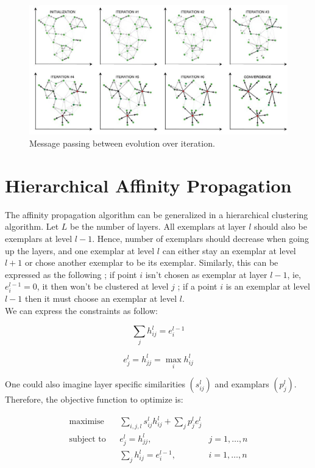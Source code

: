 \documentclass{ipol}
\begin{document}
\begin{figure}
\includegraphics[width=500px]{./images/AP_frey.png}
\caption{Message passing between evolution over iteration.}
\end{figure}

\section{Hierarchical Affinity Propagation}

The affinity propagation algorithm can be generalized in a hierarchical
clustering algorithm. Let $L$ be the number of layers. All exemplars at layer
$l$ should also be exemplars at level $l -1$. Hence, number of exemplars
should decrease when going up the layers, and one exemplar at level $l$ can
either stay an exemplar at level $l + 1$ or chose another exemplar to be its
exemplar. Similarly, this can be expressed as the following ; if point $i$ isn't chosen as
exemplar at layer $l - 1$, ie, $e_{i}^{l - 1} = 0$, it then won't be clustered at
level $j$ ; if a point $i$ is an exemplar at level $l -1$ then it must choose
an exemplar at level $l$.\\

We can express the constraints as follow:

\begin{equation}
\sum_{j} h_{ij}^l = e_i^{l-1}
\end{equation}

\begin{equation}
e_j^l = h_{jj}^l = \max_i h_{ij}^l
\end{equation}

One could also imagine layer specific similarities $(s^l_{ij})$ and examplars
$(p^l_j)$. Therefore, the objective function to optimize is:

\begin{equation*}
\renewcommand{\arraystretch}{2}
\begin{array}{ccll}
\text{maximise} & & \sum_{i, j, l} s^l_{ij} h^l_{ij} + \sum_{j} p^l_j e^l_j \\
\text{subject to} &  & e^l_{j} = h^l_{jj}, & j = 1, \dots, n\\
		  &  & \sum_{j} h_{ij}^l = e_i^{l-1}, & i = 1, \dots, n\\

\end{array}
\end{equation*}
\end{document}
